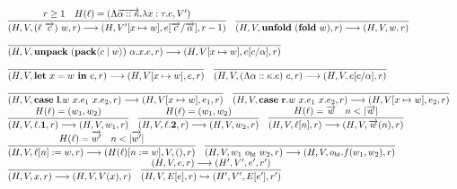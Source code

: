 \documentclass[fleqn]{article}
\begin{document}
\[\begin{array}{l}
	\\
	\infer{(H,V,(\ell~\overrightarrow{c})~w,r) \longrightarrow (H,V'[x \mapsto w],e[\overrightarrow{c}/\overrightarrow{\alpha}],r-1) }{r \ge 1 & H(\ell) = (\Lambda \overrightarrow{\alpha :: \kappa}. \lambda x:\tau. e, V')} \hspace{1em}
	\infer{(H,V,\mathbf{unfold}~(\mathbf{fold}~w),r) \longrightarrow (H,V,w,r)}{} \\
	\infer{(H,V,\mathbf{unpack}~(\mathbf{pack} \langle c \mid w \rangle )~\alpha.x.e, r) \longrightarrow (H,V[x \mapsto w],e[c/\alpha],r)}{\vspace{1em}} \\
	\infer{(H,V,\mathbf{let}~x=w~\mathbf{in}~e,r) \longrightarrow (H,V[x \mapsto w],e,r)}{\vspace{1em}} \hspace{1em}
	\infer{(H,V,(\Lambda \alpha :: \kappa. e)~c,r) \longrightarrow (H,V,e[c/\alpha],r)}{\vspace{1em}} \\
	\infer{(H,V,\mathbf{case}~\mathbf{l}.w~x.e_1~x.e_2,r) \longrightarrow (H,V[x \mapsto w],e_1,r)}{\vspace{1em}} \hspace{1em}
	\infer{(H,V,\mathbf{case}~\mathbf{r}.w~x.e_1~x.e_2,r) \longrightarrow (H,V[x \mapsto w],e_2,r)}{\vspace{1em}} \\
	\infer{(H,V,\ell.\mathbf{1},r) \longrightarrow (H,V,w_1,r)}{H(\ell) = (w_1,w_2)} \hspace{1em}
	\infer{(H,V,\ell.\mathbf{2},r) \longrightarrow (H,V,w_2,r)}{H(\ell) = (w_1,w_2)} \hspace{1em}
	\infer{(H,V,\ell[n],r) \longrightarrow (H,V,\overrightarrow{w}(n),r)}{H(\ell)=\overrightarrow{w} & n < |\overrightarrow{w}|} \\
	\infer{(H,V,\ell[n] := w,r) \longrightarrow (H(\ell)[n := w],V,(),r)}{H(\ell) = \overrightarrow{w'} & n < |\overrightarrow{w'}|} \hspace{1em}
	\infer{(H,V,w_1~o_{bt}~w_2,r) \longrightarrow (H,V,o_{bt}.f(w_1,w_2),r)}{\vspace{1em}} \\
	\infer{(H,V,x,r) \longrightarrow (H,V,V(x),r)}{\vspace{1em}} \hspace{1em}
	\infer{(H,V,E[e],r) \hookrightarrow (H',V',E[e'],r')}{(H,V,e,r) \longrightarrow (H',V',e',r')}
	\\
	\\
	\\

\end{array}\]
\end{document}
